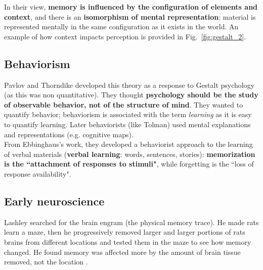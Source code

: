 In their view, \textbf{memory is influenced by the configuration of elements and context}, and there is an \textbf{isomorphism of mental representation}: material is represented mentally in the same configuration as it exists in the world. An example of how context impacts perception is provided in Fig.~\ref{fig:gestalt_2}.\\


\subsection{Behaviorism}
Pavlov and Thorndike developed this theory as a response to Gestalt psychology (as this was non quantitative). They thought \textbf{psychology should be the study of observable behavior, not of the structure of mind}. They wanted to quantify behavior; behaviorism is associated with the term \textit{learning} as it is easy to quantify learning. Later behaviorists (like Tolman) used mental explanations and representations (e.g. cognitive maps).\\
From Ebbinghaus's work, they developed a behaviorist approach to the learning of verbal materials (\textbf{verbal learning}: words, sentences, stories): \textbf{memorization is the ``attachment of responses to stimuli"}, while forgetting is the ``loss of response availability".

\subsection{Early neuroscience}
Lashley searched for the brain engram (the physical memory trace). He made rats learn a maze, then he progressively removed larger and larger portions of rats brains from different locations and tested them in the maze to see how memory changed. He found memory was affected more by the amount of brain tissue removed, not the location \notet.

